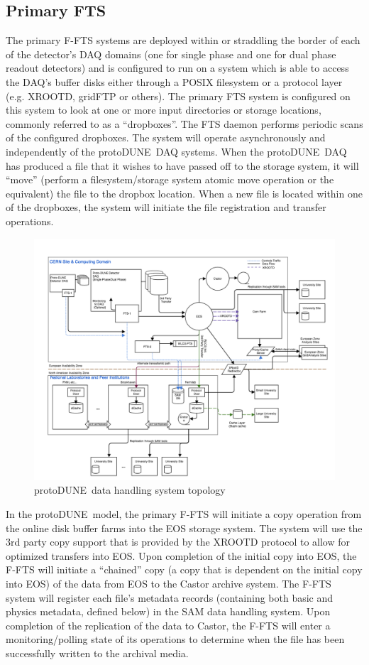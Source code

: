 \documentclass[pdftex,12pt,letter]{article}
\newcommand{\pd}{protoDUNE\ }
\begin{document}
\subsection{Primary FTS}
The  primary F-FTS systems are deployed within or straddling the border
of each of the detector’s DAQ domains (one for single phase and one for dual phase readout detectors) and is configured to run on a system which is able to access
the DAQ’s buffer disks either through a POSIX filesystem or a protocol layer (e.g. XROOTD, gridFTP or others).  The primary FTS system is configured on this system
to look at one or more input directories or storage locations, commonly referred to as a “dropboxes”.  The FTS daemon performs periodic scans of the configured dropboxes.
The system will operate asynchronously and independently of the \pd DAQ systems.  When the \pd DAQ has produced a file that it wishes to have passed off to the storage system,
it will “move” (perform a filesystem/storage system atomic move operation or the equivalent) the file to the dropbox location. When a new file is located within one of the dropboxes,
the system will initiate the file registration and transfer operations.
\begin{figure}[tbh]
\centering\includegraphics[width=0.99\linewidth]{protDune-datahandling-topology.png}
\caption{\label{fig:sys_topology}\pd data handling system topology}
\end{figure}
In the \pd model, the primary F-FTS will initiate a copy operation from the online disk buffer farms into the EOS storage system.  The system will use the 3rd party copy support that is provided by the XROOTD protocol to allow for optimized transfers into EOS.  Upon completion of the initial copy into EOS, the F-FTS will initiate a “chained” copy (a copy that is dependent on the initial copy into EOS) of the data from EOS to the Castor archive system.  The F-FTS system will register each file’s metadata records (containing both basic and physics metadata, defined below)  in the SAM data handling system.  Upon completion of the replication of the data to Castor, the F-FTS will enter a monitoring/polling state of its operations to determine when the file has been successfully written to the archival media.
\end{document}
